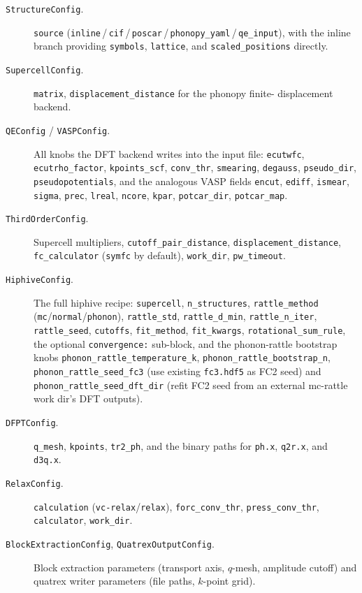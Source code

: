 \begin{description}
  \item[\texttt{StructureConfig}.]  \texttt{source}
        (\texttt{inline}\,/\,\texttt{cif}\,/\,\texttt{poscar}\,/\,\texttt{phonopy\_yaml}\,/\,\texttt{qe\_input}),
        with the inline branch providing \texttt{symbols},
        \texttt{lattice}, and \texttt{scaled\_positions} directly.
  \item[\texttt{SupercellConfig}.]  \texttt{matrix},
        \texttt{displacement\_distance} for the phonopy finite-
        displacement backend.
  \item[\texttt{QEConfig} / \texttt{VASPConfig}.]  All knobs the DFT
        backend writes into the input file: \texttt{ecutwfc},
        \texttt{ecutrho\_factor}, \texttt{kpoints\_scf}, \texttt{conv\_thr},
        \texttt{smearing}, \texttt{degauss}, \texttt{pseudo\_dir},
        \texttt{pseudopotentials}, and the analogous VASP fields
        \texttt{encut}, \texttt{ediff}, \texttt{ismear}, \texttt{sigma},
        \texttt{prec}, \texttt{lreal}, \texttt{ncore}, \texttt{kpar},
        \texttt{potcar\_dir}, \texttt{potcar\_map}.
  \item[\texttt{ThirdOrderConfig}.]  Supercell multipliers,
        \texttt{cutoff\_pair\_distance}, \texttt{displacement\_distance},
        \texttt{fc\_calculator} (\texttt{symfc} by default),
        \texttt{work\_dir}, \texttt{pw\_timeout}.
  \item[\texttt{HiphiveConfig}.]  The full hiphive recipe:
        \texttt{supercell}, \texttt{n\_structures}, \texttt{rattle\_method}
        (\texttt{mc}/\texttt{normal}/\texttt{phonon}), \texttt{rattle\_std},
        \texttt{rattle\_d\_min}, \texttt{rattle\_n\_iter},
        \texttt{rattle\_seed}, \texttt{cutoffs}, \texttt{fit\_method},
        \texttt{fit\_kwargs}, \texttt{rotational\_sum\_rule}, the optional
        \texttt{convergence:} sub-block, and the phonon-rattle bootstrap
        knobs \texttt{phonon\_rattle\_temperature\_k},
        \texttt{phonon\_rattle\_bootstrap\_n},
        \texttt{phonon\_rattle\_seed\_fc3} (use existing
        \texttt{fc3.hdf5} as FC2 seed) and
        \texttt{phonon\_rattle\_seed\_dft\_dir} (refit FC2 seed from an
        external mc-rattle work dir's DFT outputs).
  \item[\texttt{DFPTConfig}.]  \texttt{q\_mesh}, \texttt{kpoints},
        \texttt{tr2\_ph}, and the binary paths for \texttt{ph.x},
        \texttt{q2r.x}, and \texttt{d3q.x}.
  \item[\texttt{RelaxConfig}.]  \texttt{calculation}
        (\texttt{vc-relax}/\texttt{relax}), \texttt{forc\_conv\_thr},
        \texttt{press\_conv\_thr}, \texttt{calculator},
        \texttt{work\_dir}.
  \item[\texttt{BlockExtractionConfig},
        \texttt{QuatrexOutputConfig}.]  Block extraction parameters
        (transport axis, $q$-mesh, amplitude cutoff) and quatrex
        writer parameters (file paths, $k$-point grid).
\end{description}

